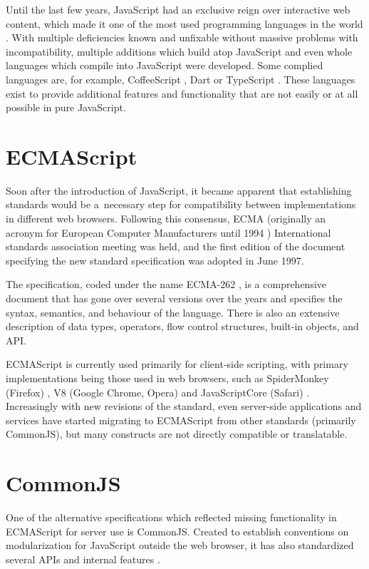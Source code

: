 Until the last few years, JavaScript had an exclusive reign over interactive web
content, which made it one of the most used programming languages in the world
\cite{stack-overflow-survey}. With multiple deficiencies known and unfixable
without massive problems with incompatibility, multiple additions which build
atop JavaScript and even whole languages which compile into JavaScript were
developed. Some complied languages are, for example, CoffeeScript
\cite{coffeescript-homepage}, Dart \cite{dart-homepage} or TypeScript
\cite{typescript-homepage}. These languages exist to provide additional features
and functionality that are not easily or at all possible in pure JavaScript.


\section*{ECMAScript}
Soon after the introduction of JavaScript, it became apparent that establishing
standards would be a~necessary step for compatibility between implementations in
different web browsers. Following this consensus, ECMA (originally an acronym
for European Computer Manufacturers until 1994 \cite{ecma-mission})
International standards association meeting was held, and the first edition of
the document specifying the new standard specification was adopted in June 1997.

The specification, coded under the name ECMA-262 \cite{ecma-262}, is a
comprehensive document that has gone over several versions over the years and
specifies the syntax, semantics, and behaviour of the language. There is also an
extensive description of data types, operators, flow control structures,
built-in objects, and API.

ECMAScript is currently used primarily for client-side scripting, with primary
implementations being those used in web browsers, such as SpiderMonkey (Firefox)
\cite{spidermonkey-documentation}, V8 (Google Chrome, Opera) \cite{v8-homepage}
and JavaScriptCore (Safari) \cite{javascript-core}. Increasingly with new
revisions of the standard, even server-side applications and services have
started migrating to ECMAScript from other standards (primarily CommonJS), but
many constructs are not directly compatible or translatable.


\section*{CommonJS}
One of the alternative specifications which reflected missing functionality in
ECMAScript for server use is CommonJS. Created to establish conventions on
modularization for JavaScript outside the web browser, it has also standardized
several APIs and internal features \cite{commonjs-spec}. 

